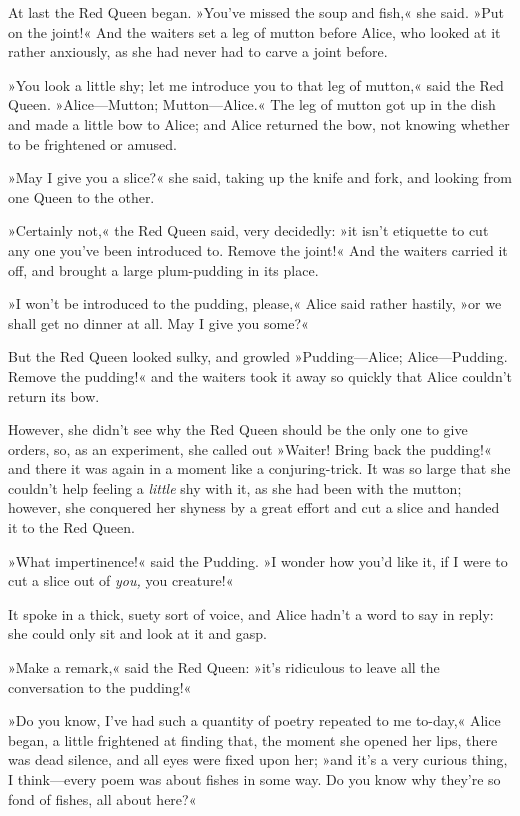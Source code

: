 \label{white10}

At last the Red Queen began. »You've missed the soup and fish,« she said. »Put on the joint!« And the waiters set a leg of mutton before Alice, who looked at it rather anxiously, as she had never had to carve a joint before.

»You look a little shy; let me introduce you to that leg of mutton,« said the Red Queen. »Alice—Mutton; Mutton—Alice.« The leg of mutton got up in the dish and made a little bow to Alice; and Alice returned the bow, not knowing whether to be frightened or amused.

»May I give you a slice?« she said, taking up the knife and fork, and looking from one Queen to the other.

»Certainly not,« the Red Queen said, very decidedly: »it isn't etiquette to cut any one you've been introduced to. Remove the joint!« And the waiters carried it off, and brought a large plum-pudding in its place.

»I won't be introduced to the pudding, please,« Alice said rather hastily, »or we shall get no dinner at all. May I give you some?«

But the Red Queen looked sulky, and growled »Pudding—Alice; Alice—Pudding. Remove the pudding!« and the waiters took it away so quickly that Alice couldn't return its bow.

However, she didn't see why the Red Queen should be the only one to give orders, so, as an experiment, she called out »Waiter! Bring back the pudding!« and there it was again in a moment like a conjuring-trick. It was so large that she couldn't help feeling a \textit{little} shy with it, as she had been with the mutton; however, she conquered her shyness by a great effort and cut a slice and handed it to the Red Queen.

»What impertinence!« said the Pudding. »I wonder how you'd like it, if I were to cut a slice out of \textit{you,} you creature!«

It spoke in a thick, suety sort of voice, and Alice hadn't a word to say in reply: she could only sit and look at it and gasp.

»Make a remark,« said the Red Queen: »it's ridiculous to leave all the conversation to the pudding!«

»Do you know, I've had such a quantity of poetry repeated to me to-day,« Alice began, a little frightened at finding that, the moment she opened her lips, there was dead silence, and all eyes were fixed upon her; »and it's a very curious thing, I think—every poem was about fishes in some way. Do you know why they're so fond of fishes, all about here?«

